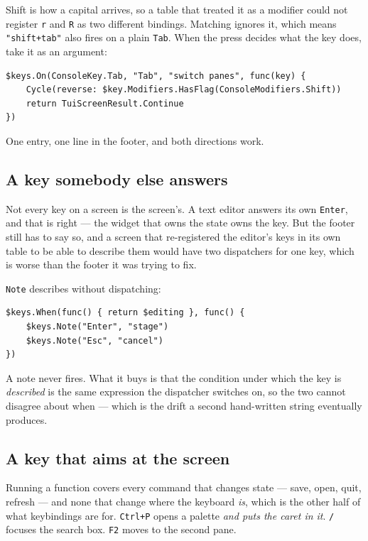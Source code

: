 \documentclass[11pt,a4paper,twoside,openany]{book}
\newcommand{\code}[1]{\texttt{\small #1}}
\begin{document}
\begin{warnbox}
Shift is how a capital arrives, so a table that treated it as a modifier could not
register \code{r} and \code{R} as two different bindings. Matching ignores it, which
means \code{"shift+tab"} also fires on a plain \code{Tab}. When the press decides
what the key does, take it as an argument:

\begin{lstlisting}
$keys.On(ConsoleKey.Tab, "Tab", "switch panes", func(key) {
    Cycle(reverse: $key.Modifiers.HasFlag(ConsoleModifiers.Shift))
    return TuiScreenResult.Continue
})
\end{lstlisting}

\noindent One entry, one line in the footer, and both directions work.
\end{warnbox}

\subsection{A key somebody else answers}

Not every key on a screen is the screen's. A text editor answers its own
\code{Enter}, and that is right --- the widget that owns the state owns the key.
But the footer still has to say so, and a screen that re-registered the editor's keys
in its own table to be able to describe them would have two dispatchers for one key,
which is worse than the footer it was trying to fix.

\code{Note} describes without dispatching:

\begin{lstlisting}
$keys.When(func() { return $editing }, func() {
    $keys.Note("Enter", "stage")
    $keys.Note("Esc", "cancel")
})
\end{lstlisting}

\noindent A note never fires. What it buys is that the condition under which the key
is \emph{described} is the same expression the dispatcher switches on, so the two
cannot disagree about when --- which is the drift a second hand-written string
eventually produces.

\subsection{A key that aims at the screen}

Running a function covers every command that changes state --- save, open, quit,
refresh --- and none that change where the keyboard \emph{is}, which is the other
half of what keybindings are for. \code{Ctrl+P} opens a palette \emph{and puts the
caret in it}. \code{/} focuses the search box. \code{F2} moves to the second pane.
\end{document}
